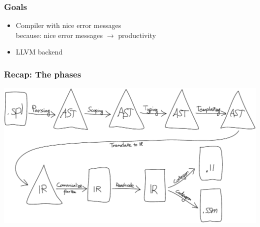 \documentclass[14pt]{beamer}
\title{\splang}
\author{Wouter Geraedts \and Joshua Moerman}
\institute{Radboud Universiteit Nijmegen}
\date{}
\newcommand{\llvm}{\textsc{LLVM}\xspace}
\begin{document}
\begin{frame}
	\titlepage
\end{frame}

\begin{frame}
	\frametitle{Goals}
	\begin{itemize}
		\item Compiler with nice error messages \\
			{\small because: nice error messages $\rightarrow$ productivity}
		\item \llvm backend
	\end{itemize}
\end{frame}

\begin{frame}
\begin{center}
	\frametitle{Recap: The phases}
	\includegraphics[width=\textwidth]{phases}
\end{center}
\end{frame}
\end{document}
